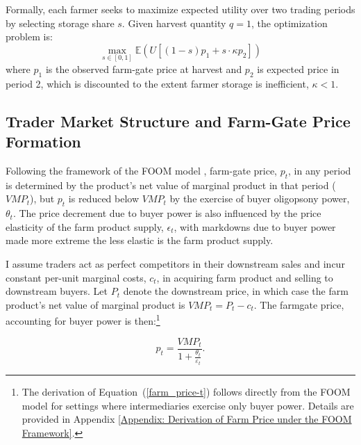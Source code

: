 Formally, each farmer seeks to maximize expected utility over two trading periods by selecting storage share $s$. Given harvest quantity $q = 1$, the optimization problem is:
\begin{equation}
\label{eq:starting objective}
\max_{s \in [0,1]} \mathbb{E} \left(U\left[ (1 - s) p_1 + s \cdot \kappa p_{2} \right]\right)
\end{equation}
where $p_1$ is the observed farm-gate price at harvest and $p_{2}$ is expected price in period 2, which is discounted to the extent farmer storage is inefficient, $\kappa < 1$.


\subsection{Trader Market Structure and Farm-Gate Price Formation} \label{Section: Middlemen Market Structure and Farm-Gate Price Formation}
\noindent
Following the framework of the FOOM model \citep{karp1996dynamic,sexton2001assessment,saitone2009flexible,Perekhozhuk_2017, hamilton2021joint}, farm-gate price, $p_t$, in any period is determined by the product's net value of marginal product in that period ($VMP_t$), but $p_t$ is reduced below $VMP_t$ by the exercise of buyer oligopsony power, $\theta_t$. The price decrement due to buyer power is also influenced by the price elasticity of the farm product supply, $\epsilon_t$, with markdowns due to buyer power made more extreme the less elastic is the farm product supply. 

I assume traders act as perfect competitors in their downstream sales and incur constant per-unit marginal costs, $c_t$, in acquiring farm product and selling to downstream buyers. Let $P_t$ denote the downstream price, in which case the farm product's net value of marginal product is $VMP_t = P_t-c_t$. The farmgate price, accounting for buyer power is then:\footnote{The derivation of Equation~(\ref{farm_price-t}) follows directly from the FOOM model for settings where intermediaries exercise only buyer power. Details are provided in Appendix \ref{Appendix: Derivation of Farm Price under the FOOM Framework}. }

\begin{equation}
\label{farm_price-t}
p_{t} = \frac{VMP_t}{1 + \frac{\theta_t}{\varepsilon_t}}.
\end{equation}

